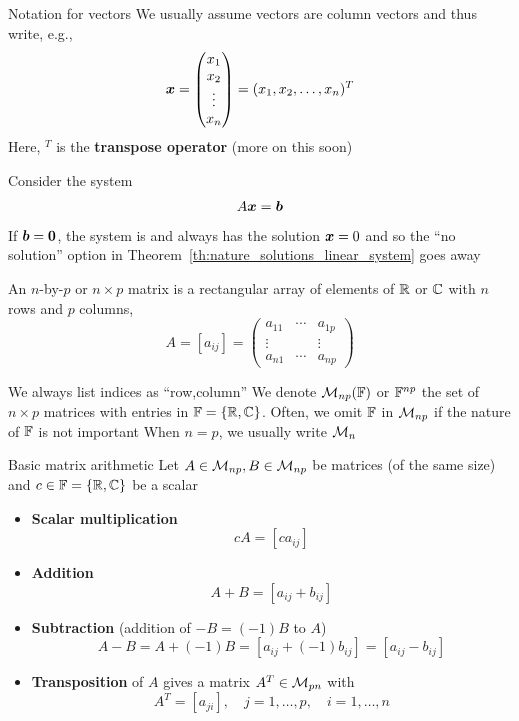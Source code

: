 \documentclass[aspectratio=169]{beamer}\usepackage[]{graphicx}\usepackage[]{xcolor}
\begin{document}
\begin{frame}{Notation for vectors}
We usually assume vectors are column vectors and thus write, e.g.,
\[ 
\bm{x}=
\begin{pmatrix}
x_1\\ x_2 \\ \vdots \\ x_n
\end{pmatrix}
= (x_1,x_2,\ldots,x_n)^T
\]
Here, $^T$ is the \textbf{transpose operator} (more on this soon)
\end{frame}



\begin{frame}
Consider the system
\[
A\bm{x}=\bm{b}
\]
\vfill
If $\bb=\b0$, the system is  and always has the solution $\bm{x}=0$ and so the ``no solution'' option in Theorem~\ref{th:nature_solutions_linear_system} goes away
\end{frame}



\begin{frame}
	\begin{importantdefinition}[Matrix]
		An $n$-by-$p$ or $n\times p$ matrix is a rectangular array of elements of $\mathbb{R}$ or $\mathbb{C}$ with $n$ rows and $p$ columns,
		\[
		A=[a_{ij}]=
		\begin{pmatrix}
		a_{11} & \cdots & a_{1p} \\
		\vdots & & \vdots \\
		a_{n1} & \cdots & a_{np}
		\end{pmatrix}
		\]
	\end{importantdefinition}
	\vfill
	We always list indices as ``row,column''
	\vfill
	We denote $\mathcal{M}_{np}(\mathbb{F})$ or $\mathbb{F}^{np}$ the set of $n\times p$ matrices with entries in $\mathbb{F}=\{\mathbb{R},\mathbb{C}\}$. Often, we omit $\mathbb{F}$ in $\mathcal{M}_{np}$ if the nature of $\mathbb{F}$ is not important
	\vfill
	When $n=p$, we usually write $\mathcal{M}_n$
\end{frame}

\begin{frame}{Basic matrix arithmetic}
Let $A\in\mathcal{M}_{np},B\in\mathcal{M}_{np}$ be matrices (of the same size) and $c\in\mathbb{F}=\{\mathbb{R},\mathbb{C}\}$ be a scalar
\begin{itemize}
	\item \textbf{Scalar multiplication}
	\[
	cA = [ca_{ij}]
	\]
	\item \textbf{Addition}
	\[
	A+B = [a_{ij}+b_{ij}]
	\]
	\item \textbf{Subtraction} (addition of $-B=(-1)B$ to $A$)
	\[
	A-B=A+(-1)B=[a_{ij}+(-1)b_{ij}]=[a_{ij}-b_{ij}]
	\]
	\item \textbf{Transposition} of $A$ gives a matrix $A^T\in\mathcal{M}_{pn}$ with
	\[
	A^T=[a_{ji}],\quad j=1,\ldots,p,\quad i=1,\ldots,n
	\]
\end{itemize}
\end{frame}
\end{document}
